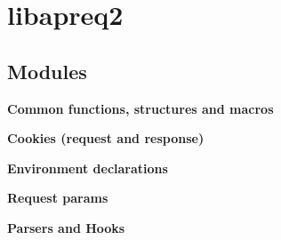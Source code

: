 \section{libapreq2}
\label{group__LIBRARY}
\subsection*{Modules}
\begin{CompactItemize}
\item 
{\bf Common functions, structures and macros}
\item 
{\bf Cookies (request and response)}
\item 
{\bf Environment declarations}
\item 
{\bf Request params}
\item 
{\bf Parsers and Hooks}
\end{CompactItemize}
